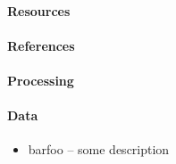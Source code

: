 
\paragraph{Resources} %
\label{par:resources}


\paragraph{References} %
\label{par:references}


\paragraph{Processing} %
\label{par:processing}


\paragraph{Data} %
\label{par:data}
   \begin{itemize}
    \item barfoo -- some description
   \end{itemize}
